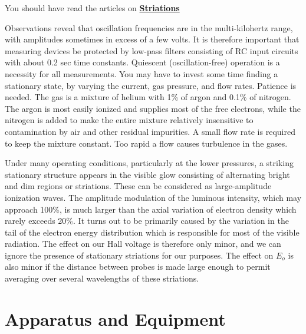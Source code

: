 \documentclass{../lab}
\begin{document}
You should have read the articles on \href{http://physics111.lib.berkeley.edu/Physics111/Reprints/HAL/04-Striations.pdf}{\textbf{Striations}}

Observations reveal that oscillation frequencies are in the multi-kilohertz range, with amplitudes sometimes in excess of a few volts. It is therefore important that measuring devices be protected by low-pass filters consisting of RC input circuits with about 0.2 sec time constants. Quiescent (oscillation-free) operation is a necessity for all measurements. You may have to invest some time finding a stationary state, by varying the current, gas pressure, and flow rates. Patience is needed. The gas is a mixture of helium with 1\% of argon and 0.1\% of nitrogen. The argon is most easily ionized and supplies most of the free electrons, while the nitrogen is added to make the entire mixture relatively insensitive to contamination by air and other residual impurities. A small flow rate is required to keep the mixture constant. Too rapid a flow causes turbulence in the gases.

Under many operating conditions, particularly at the lower pressures, a striking stationary structure appears in the visible glow consisting of alternating bright and dim regions or striations. These can be considered as large-amplitude ionization waves. The amplitude modulation of the luminous intensity, which may approach 100\%, is much larger than the axial variation of electron density which rarely exceeds 20\%. It turns out to be primarily caused by the variation in the tail of the electron energy distribution which is responsible for most of the visible radiation. The effect on our Hall voltage is therefore only minor, and we can ignore the presence of stationary striations for our purposes. The effect on $E_o$ is also minor if the distance between probes is made large enough to permit averaging over several wavelengths of these striations.

\section{Apparatus and Equipment}
\end{document}
